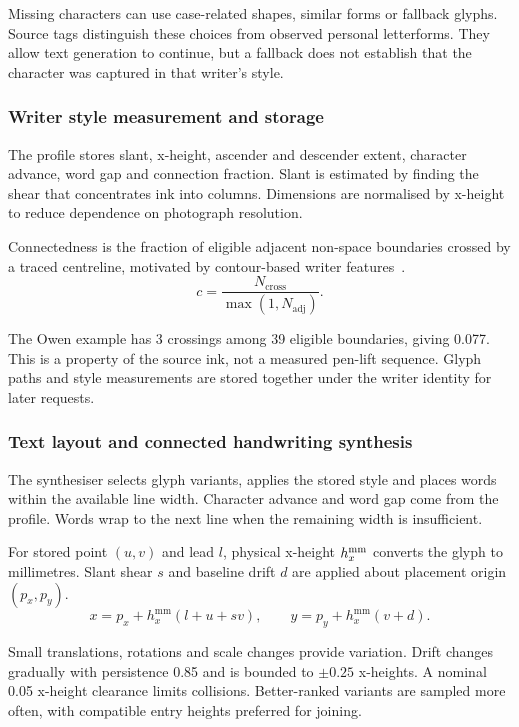 Missing characters can use case-related shapes, similar forms or fallback glyphs. Source tags distinguish these choices from observed personal letterforms. They allow text generation to continue, but a fallback does not establish that the character was captured in that writer's style.

\subsubsection{Writer style measurement and storage}
\label{sec:des-profile}
The profile stores slant, x-height, ascender and descender extent, character advance, word gap and connection fraction. Slant is estimated by finding the shear that concentrates ink into columns. Dimensions are normalised by x-height to reduce dependence on photograph resolution.

Connectedness is the fraction of eligible adjacent non-space boundaries crossed by a traced centreline, motivated by contour-based writer features~\cite[p.~701]{bulacu2007}.
\begin{equation}
c=\frac{N_{\mathrm{cross}}}{\max(1,N_{\mathrm{adj}})}.
\label{eq:des-connectedness}
\end{equation}

The Owen example has 3 crossings among 39 eligible boundaries, giving 0.077. This is a property of the source ink, not a measured pen-lift sequence. Glyph paths and style measurements are stored together under the writer identity for later requests.

\subsubsection{Text layout and connected handwriting synthesis}
\label{sec:des-layout}
The synthesiser selects glyph variants, applies the stored style and places words within the available line width. Character advance and word gap come from the profile. Words wrap to the next line when the remaining width is insufficient.

For stored point $(u,v)$ and lead $l$, physical x-height $h_x^{\rm mm}$ converts the glyph to millimetres. Slant shear $s$ and baseline drift $d$ are applied about placement origin $(p_x,p_y)$.
\begin{equation}
x=p_x+h_x^{\mathrm{mm}}(l+u+sv),\qquad
y=p_y+h_x^{\mathrm{mm}}(v+d).
\label{eq:des-placement}
\end{equation}

Small translations, rotations and scale changes provide variation. Drift changes gradually with persistence 0.85 and is bounded to $\pm0.25$ x-heights. A nominal 0.05 x-height clearance limits collisions. Better-ranked variants are sampled more often, with compatible entry heights preferred for joining.

